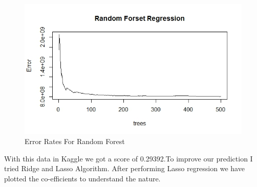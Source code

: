 \documentclass[fleqn,10pt]{SelfArx} %
\begin{document}
\begin{figure}[ht]\centering %
\includegraphics[width=\linewidth]{Figure4}
\caption{Error Rates For Random Forest}
\label{fig:Figure4}
\end{figure}

With this data in Kaggle we got a score of 0.29392.To improve our prediction I tried Ridge and Lasso Algorithm.
After performing Lasso regression we have plotted the co-efficients to understand the nature.
\end{document}
